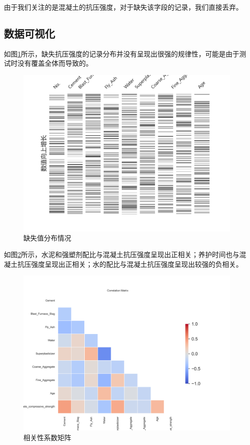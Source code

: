 由于我们关注的是混凝土的抗压强度，对于缺失该字段的记录，我们直接丢弃。

\subsection{数据可视化}

如图\ref{missing}所示，缺失抗压强度的记录分布并没有呈现出很强的规律性，可能是由于测试时没有覆盖全体而导致的。

\begin{figure}[!htbp]
    \centering
    \includegraphics[scale=1]{images/missing.png}
    \caption{缺失值分布情况}\label{missing}
\end{figure}

如图\ref{correlation}所示，水泥和强塑剂配比与混凝土抗压强度呈现出正相关；养护时间也与混凝土抗压强度呈现出正相关；水的配比与混凝土抗压强度呈现出较强的负相关。

\begin{figure}[!htbp]
    \centering
    \includegraphics[scale=1]{images/correlation.png}
    \caption{相关性系数矩阵}\label{correlation}
\end{figure}

